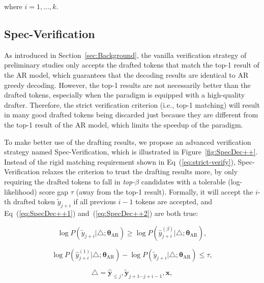 where $i=1,\ldots,k$.

\subsection{Spec-Verification}
\label{sec:SpecDec++}
As introduced in Section~\ref{sec:Background}, the vanilla verification strategy of preliminary studies only accepts the drafted tokens that match the top-1 result of the AR model, which guarantees that the decoding results are identical to AR greedy decoding. However, the top-1 results are not necessarily better than the drafted tokens, especially when the paradigm is equipped with a high-quality drafter. Therefore, the strict verification criterion (i.e., top-1 matching) will result in many good drafted tokens being discarded just because they are different from the top-1 result of the AR model, which limits the speedup of the paradigm.

To make better use of the drafting results, we propose an advanced verification strategy named Spec-Verification, which is illustrated in Figure~\ref{fig:SpecDec++}. Instead of the rigid matching requirement shown in Eq~(\ref{eq:strict-verify}), Spec-Verification relaxes the criterion to trust the drafting results more, by only requiring the drafted tokens to fall in \textit{top-$\beta$} candidates with a tolerable (log-likelihood) score gap $\tau$ (away from the top-1 result). Formally, it will accept the $i$-th drafted token $\widetilde{y}_{j+i}$ if all previous $i-1$ tokens are accepted, and Eq~(\ref{eq:SpecDec++1}) and~(\ref{eq:SpecDec++2}) are both true:

\begin{small}
\begin{equation}\label{eq:SpecDec++1}
   \log P(\widetilde{y}_{j+i}|\triangle;\bm{\theta}_{\textrm{AR}}) \ge \log P(\hat{y}_{j+i}^{(\beta)}|\triangle;\bm{\theta}_{\textrm{AR}}),
\end{equation}
\end{small}

\begin{small}
\begin{equation}\label{eq:SpecDec++2}
    \log P(\hat{y}_{j+i}^{(1)}|\triangle;\bm{\theta}_{\textrm{AR}}) - \log P(\widetilde{y}_{j+i}|\triangle;\bm{\theta}_{\textrm{AR}}) \le \tau,
\end{equation}
\end{small}

\begin{small}
\begin{equation}
    \triangle = \hat{\bm{y}}_{\le j}, \widetilde{\bm{y}}_{j+1 \cdots j+i-1}, \bm{x},
\end{equation}
\end{small}


